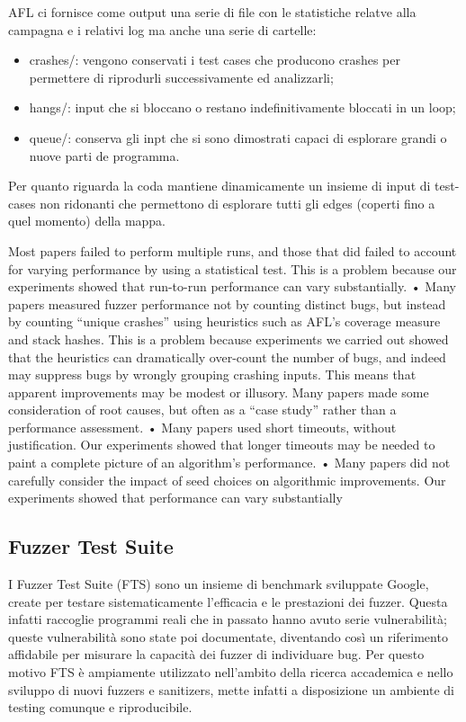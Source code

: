 AFL ci fornisce come output una serie di file con le statistiche relatve alla campagna e i relativi log ma anche una serie di cartelle:
\begin{itemize}
    \item crashes/: vengono conservati i test cases che producono crashes per permettere di riprodurli successivamente ed analizzarli;
    \item hangs/: input che si bloccano o restano indefinitivamente bloccati in un loop;
    \item queue/: conserva gli inpt che si sono dimostrati capaci di esplorare grandi o nuove parti de programma.
\end{itemize}
Per quanto riguarda la coda mantiene dinamicamente un insieme di input di test-cases non ridonanti che permettono di esplorare tutti gli edges (coperti fino a quel momento) della mappa. 

Most papers failed to perform multiple runs, and those that did
failed to account for varying performance by using a statistical
test. This is a problem because our experiments showed that
run-to-run performance can vary substantially.
• Many papers measured fuzzer performance not by counting
distinct bugs, but instead by counting “unique crashes” using
heuristics such as AFL’s coverage measure and stack hashes.
This is a problem because experiments we carried out showed
that the heuristics can dramatically over-count the number
of bugs, and indeed may suppress bugs by wrongly grouping
crashing inputs. This means that apparent improvements may
be modest or illusory. Many papers made some consideration
of root causes, but often as a “case study” rather than a performance assessment.
• Many papers used short timeouts, without justification. Our
experiments showed that longer timeouts may be needed to
paint a complete picture of an algorithm’s performance.
• Many papers did not carefully consider the impact of seed
choices on algorithmic improvements. Our experiments showed
that performance can vary substantially \cite{ref21}

\subsection{Fuzzer Test Suite}

I Fuzzer Test Suite (FTS) sono un insieme di benchmark sviluppate Google, create per testare sistematicamente l’efficacia e le prestazioni dei fuzzer. Questa infatti raccoglie programmi reali che in passato hanno avuto serie vulnerabilità; queste vulnerabilità sono state poi documentate, diventando così un riferimento affidabile per misurare la capacità dei fuzzer di individuare bug.  Per questo motivo FTS è ampiamente utilizzato nell’ambito della ricerca accademica e nello sviluppo di nuovi fuzzers e sanitizers, mette infatti a disposizione un ambiente di testing comunque e riproducibile.

